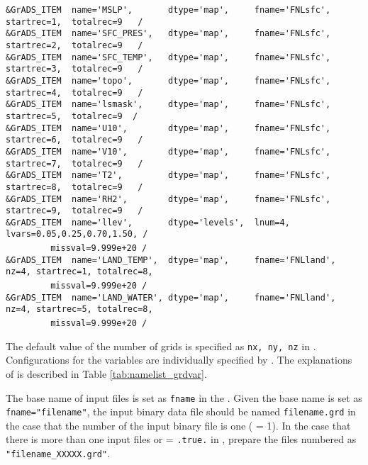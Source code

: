 {\verb|&GrADS_ITEM  name='MSLP',       dtype='map',     fname='FNLsfc', startrec=1,  totalrec=9   / |  \\
\verb|&GrADS_ITEM  name='SFC_PRES',   dtype='map',     fname='FNLsfc', startrec=2,  totalrec=9   / |  \\
\verb|&GrADS_ITEM  name='SFC_TEMP',   dtype='map',     fname='FNLsfc', startrec=3,  totalrec=9   / |  \\
\verb|&GrADS_ITEM  name='topo',       dtype='map',     fname='FNLsfc', startrec=4,  totalrec=9   / |  \\
\verb|&GrADS_ITEM  name='lsmask',     dtype='map',     fname='FNLsfc', startrec=5,  totalrec=9  /  |  \\
\verb|&GrADS_ITEM  name='U10',        dtype='map',     fname='FNLsfc', startrec=6,  totalrec=9   / |  \\
\verb|&GrADS_ITEM  name='V10',        dtype='map',     fname='FNLsfc', startrec=7,  totalrec=9   / |  \\
\verb|&GrADS_ITEM  name='T2',         dtype='map',     fname='FNLsfc', startrec=8,  totalrec=9   / |  \\
\verb|&GrADS_ITEM  name='RH2',        dtype='map',     fname='FNLsfc', startrec=9,  totalrec=9   / |  \\
\verb|&GrADS_ITEM  name='llev',       dtype='levels',  lnum=4, lvars=0.05,0.25,0.70,1.50, /        |  \\
~~~~~~~~\verb| missval=9.999e+20 /|  \\
\verb|&GrADS_ITEM  name='LAND_TEMP',  dtype='map',     fname='FNLland', nz=4, startrec=1, totalrec=8,|\\
~~~~~~~~\verb| missval=9.999e+20 /|  \\
\verb|&GrADS_ITEM  name='LAND_WATER', dtype='map',     fname='FNLland', nz=4, startrec=5, totalrec=8,|\\
~~~~~~~~\verb| missval=9.999e+20 /|  \\
}

The default value of the number of grids is specified as \verb|nx, ny, nz| in .
Configurations for the variables are individually specified by .
The explanations of  is described in Table \ref{tab:namelist_grdvar}.

The base name of input files is set as \verb|fname| in the .
Given the base name is set as \verb|fname="filename"|, the input binary data file should be named  \verb|filename.grd| in the case that the number of the input binary file is one ( = 1).
In the case that there is more than one input files or  = \verb|.true.| in ,
prepare the files numbered as \verb|"filename_XXXXX.grd"|.

